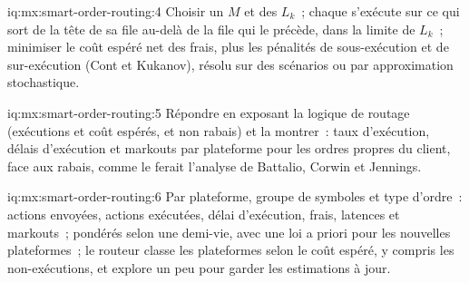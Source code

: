 \begin{solution}{iq:mx:smart-order-routing:4}
Choisir un  $M$ et des  $L_k$~; chaque  s'exécute sur ce qui sort de la tête de sa file au-delà de la file qui le précède, dans la limite de $L_k$~; minimiser le
coût espéré net des frais, plus les pénalités de sous-exécution et de sur-exécution (Cont et Kukanov), résolu sur des scénarios ou par approximation stochastique.
\end{solution}

\begin{solution}{iq:mx:smart-order-routing:5}
Répondre en exposant la logique de routage (exécutions et coût espérés, et non rabais) et la montrer~: taux d'exécution, délais d'exécution et markouts par plateforme pour les ordres propres du
client, face aux rabais, comme le ferait l'analyse de Battalio, Corwin et Jennings.
\end{solution}

\begin{solution}{iq:mx:smart-order-routing:6}
Par plateforme, groupe de symboles et type d'ordre~: actions envoyées, actions exécutées, délai d'exécution, frais, latences et markouts~; pondérés selon une demi-vie, avec une loi a priori pour
les nouvelles plateformes~; le routeur classe les plateformes selon le coût espéré, y compris les non-exécutions, et explore un peu pour garder les estimations à jour.
\end{solution}
